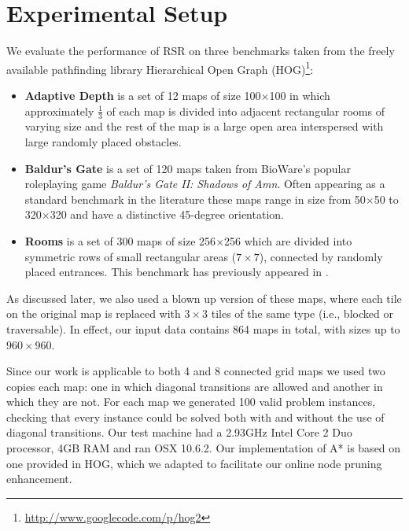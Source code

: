 \section{Experimental Setup}
We evaluate the performance of RSR on three benchmarks taken from
the freely available pathfinding library 
Hierarchical Open Graph (HOG)\footnote{\url{http://www.googlecode.com/p/hog2}}:
\begin{itemize}
\item{\textbf{Adaptive Depth} is a set of 12 maps of size 100$\times$100 in which approximately
$\frac{1}{3}$ of each map is divided into adjacent rectangular rooms of
varying size and the rest of the map is a large open area interspersed with 
large randomly placed obstacles.}
\item{\textbf{Baldur's Gate} is a set of 120 maps taken from BioWare's popular
roleplaying game \emph{Baldur's Gate II: Shadows of Amn}. 
Often appearing as a standard benchmark in the literature 
\cite{botea04,sturtevant05,bjornsson06,harabor10,pochter10} these maps range in 
size from 50$\times$50 to 320$\times$320 and have a distinctive 45-degree orientation.}
\item{\textbf{Rooms} is a set of 300 maps of size 256$\times$256 which are
divided into symmetric rows of small rectangular areas ($7\times7$), connected
by randomly placed entrances. This benchmark has previously appeared in
\cite{pochter10}.}
\end{itemize}

As discussed later, we also used a blown up version of these maps,
where each tile on the original map is replaced with $3\times3$ tiles of the same type
(i.e., blocked or traversable). In effect, our input data contains 864 maps in total,
with sizes up to $960\times960$.

Since our work is applicable to both 4 and 8 connected grid maps we used two
copies each map: one in which diagonal transitions are allowed and another
in which they are not.
For each map we generated 100 valid problem instances, checking that every
instance could be solved both with and without the use of diagonal
transitions.
%
Our test machine had a 2.93GHz Intel Core 2 Duo processor, 4GB RAM and
ran OSX 10.6.2.
Our implementation of A* is based on one provided in HOG, which we adapted to
facilitate our online node pruning enhancement.
